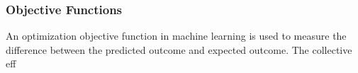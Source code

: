 \subsubsection{Objective Functions}
An optimization objective function in machine learning is used to measure the difference between the predicted outcome and expected outcome. The collective eff